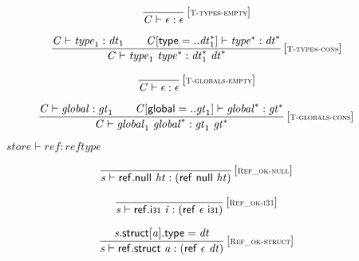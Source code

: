\vspace{1ex}

$$
\begin{array}{@{}c@{}}\displaystyle
\frac{
}{
{\mathit{C}} \vdash \epsilon : \epsilon
} \, {[\textsc{\scriptsize T{-}types{-}empty}]}
\qquad
\end{array}
$$

$$
\begin{array}{@{}c@{}}\displaystyle
\frac{
{\mathit{C}} \vdash {\mathit{type}}_{{1}} : {\mathit{dt}}_{{1}}
 \qquad
{\mathit{C}}{}[\mathsf{type} = ..{{\mathit{dt}}_{{1}}^\ast}] \vdash {{\mathit{type}}^\ast} : {{\mathit{dt}}^\ast}
}{
{\mathit{C}} \vdash {\mathit{type}}_{{1}}~{{\mathit{type}}^\ast} : {{\mathit{dt}}_{{1}}^\ast}~{{\mathit{dt}}^\ast}
} \, {[\textsc{\scriptsize T{-}types{-}cons}]}
\qquad
\end{array}
$$

$$
\begin{array}{@{}c@{}}\displaystyle
\frac{
}{
{\mathit{C}} \vdash \epsilon : \epsilon
} \, {[\textsc{\scriptsize T{-}globals{-}empty}]}
\qquad
\end{array}
$$

$$
\begin{array}{@{}c@{}}\displaystyle
\frac{
{\mathit{C}} \vdash {\mathit{global}} : {\mathit{gt}}_{{1}}
 \qquad
{\mathit{C}}{}[\mathsf{global} = ..{\mathit{gt}}_{{1}}] \vdash {{\mathit{global}}^\ast} : {{\mathit{gt}}^\ast}
}{
{\mathit{C}} \vdash {\mathit{global}}_{{1}}~{{\mathit{global}}^\ast} : {\mathit{gt}}_{{1}}~{{\mathit{gt}}^\ast}
} \, {[\textsc{\scriptsize T{-}globals{-}cons}]}
\qquad
\end{array}
$$

$\boxed{{\mathit{store}} \vdash {\mathit{ref}} : {\mathit{reftype}}}$

$$
\begin{array}{@{}c@{}}\displaystyle
\frac{
}{
{\mathit{s}} \vdash \mathsf{ref.null}~{\mathit{ht}} : (\mathsf{ref}~\mathsf{null}~{\mathit{ht}})
} \, {[\textsc{\scriptsize Ref\_ok{-}null}]}
\qquad
\end{array}
$$

$$
\begin{array}{@{}c@{}}\displaystyle
\frac{
}{
{\mathit{s}} \vdash \mathsf{ref.i{\scriptstyle31}}~{\mathit{i}} : (\mathsf{ref}~\epsilon~\mathsf{i{\scriptstyle31}})
} \, {[\textsc{\scriptsize Ref\_ok{-}i31}]}
\qquad
\end{array}
$$

$$
\begin{array}{@{}c@{}}\displaystyle
\frac{
{\mathit{s}}.\mathsf{struct}{}[{\mathit{a}}].\mathsf{type} = {\mathit{dt}}
}{
{\mathit{s}} \vdash \mathsf{ref.struct}~{\mathit{a}} : (\mathsf{ref}~\epsilon~{\mathit{dt}})
} \, {[\textsc{\scriptsize Ref\_ok{-}struct}]}
\qquad
\end{array}
$$

